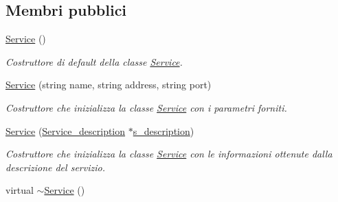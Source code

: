 \subsection*{Membri pubblici}
\begin{DoxyCompactItemize}
\item 
\hypertarget{class_service_acc246c9f7ed3c51e2d91d10fe257513f}{\hyperlink{class_service_acc246c9f7ed3c51e2d91d10fe257513f}{Service} ()}\label{class_service_acc246c9f7ed3c51e2d91d10fe257513f}

\begin{DoxyCompactList}\small\item\em Costruttore di default della classe \hyperlink{class_service}{Service}. \end{DoxyCompactList}\item 
\hyperlink{class_service_aaf16ba3725a4a48487650ed907999bfc}{Service} (string name, string address, string port)
\begin{DoxyCompactList}\small\item\em Costruttore che inizializza la classe \hyperlink{class_service}{Service} con i parametri forniti. \end{DoxyCompactList}\item 
\hyperlink{class_service_ad838a974b007483f2c43cf66b578fccc}{Service} (\hyperlink{struct_service__description}{Service\-\_\-description} $\ast$\hyperlink{class_service_a55e991ff18c0dceca202388a771283dc}{s\-\_\-description})
\begin{DoxyCompactList}\small\item\em Costruttore che inizializza la classe \hyperlink{class_service}{Service} con le informazioni ottenute dalla descrizione del servizio. \end{DoxyCompactList}\item 
\hypertarget{class_service_af6c3577b59652ac817d1d76aaccee904}{virtual \hyperlink{class_service_af6c3577b59652ac817d1d76aaccee904}{$\sim$\-Service} ()}\label{class_service_af6c3577b59652ac817d1d76aaccee904}


\end{DoxyCompactItemize}
